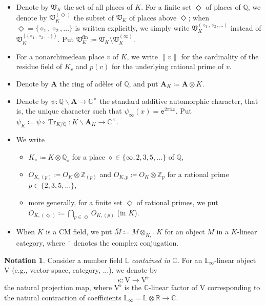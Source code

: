 \documentclass[12pt]{amsart}
\numberwithin{equation}{section}
\theoremstyle{plain}
\theoremstyle{definition}
\newtheorem{notation}[proposition]{Notation}
\theoremstyle{remark}
\renewcommand{\b}[1]{\mathbf{#1}}
\renewcommand{\d}[1]{\mathbb{#1}}
\newcommand{\f}[1]{\mathfrak{#1}}
\renewcommand{\r}[1]{\mathrm{#1}}
\renewcommand{\(}{\left(}
\renewcommand{\)}{\right)}
\newcommand{\ol}[1]{\overline{#1}{}}
\newcommand{\bA}{\b A}
\newcommand{\dC}{\d C}
\newcommand{\dL}{\d L}
\newcommand{\dQ}{\d Q}
\newcommand{\dR}{\d R}
\newcommand{\dZ}{\d Z}
\newcommand{\fV}{\f V}
\newcommand{\rV}{\r V}
\newcommand{\te}{\mathtt{e}}
\newcommand{\ti}{\mathtt{i}}
\newcommand{\fin}{\r{fin}}
\DeclareMathOperator{\Tr}{Tr}
\begin{document}
\begin{itemize}
  \item Denote by $\fV_K$ the set of all places of $K$. For a finite set $\Diamond$ of places of $\dQ$, we denote by $\fV_K^{(\Diamond)}$ the subset of $\fV_K$ of places above $\Diamond$; when $\Diamond=\{\diamond_1,\diamond_2,\dots\}$ is written explicitly, we simply write $\fV_K^{(\diamond_1,\diamond_2,\dots)}$ instead of $\fV_K^{(\{\diamond_1,\diamond_2,\dots\})}$. Put $\fV_K^\fin\coloneqq\fV_K\setminus\fV_K^{(\infty)}$.

  \item For a nonarchimedean place $v$ of $K$, we write $\|v\|$ for the cardinality of the residue field of $K_v$ and $p(v)$ for the underlying rational prime of $v$.

  \item Denote by $\bA$ the ring of ad\`eles of $\dQ$, and put $\bA_K\coloneqq\bA\otimes K$.

  \item Denote by $\psi\colon\dQ\backslash\bA\to\dC^\times$ the standard additive automorphic character, that is, the unique character such that $\psi_\infty(x)=\te^{2\pi\ti x}$. Put $\psi_K\coloneqq\psi\circ\Tr_{K/\dQ}\colon K\backslash\bA_K\to\dC^\times$.

  \item We write
      \begin{itemize}
        \item $K_\diamond\coloneqq K\otimes\dQ_\diamond$ for a place $\diamond\in\{\infty,2,3,5,\dots\}$ of $\dQ$,

        \item $O_{K,(p)}\coloneqq O_K\otimes\dZ_{(p)}$ and $O_{K,p}\coloneqq O_K\otimes\dZ_p$ for a rational prime $p\in\{2,3,5,\dots\}$,

        \item more generally, for a finite set $\Diamond$ of rational primes, we put $O_{K,(\Diamond)}\coloneqq\bigcap_{p\in\Diamond}O_{K,(p)}$ (in $K$).
      \end{itemize}

  \item When $K$ is a CM field, we put $\ol{M}\coloneqq M\otimes_{K,\ol{\phantom{a}}}K$ for an object $M$ in a $K$-linear category, where $\ol{\phantom{a}}$ denotes the complex conjugation.
\end{itemize}



\begin{notation}\label{no:contraction}
Consider a number field $\dL$ \emph{contained in} $\dC$. For an $\dL_\infty$-linear object $\rV$ (e.g., vector space, category, ...), we denote by
\[
\kappa\colon \rV\to\rV^\flat
\]
the natural projection map, where $\rV^\flat$ is the $\dC$-linear factor of $\rV$ corresponding to the natural contraction of coefficients $\dL_\infty=\dL\otimes\dR\to\dC$.
\end{notation}
\end{document}
